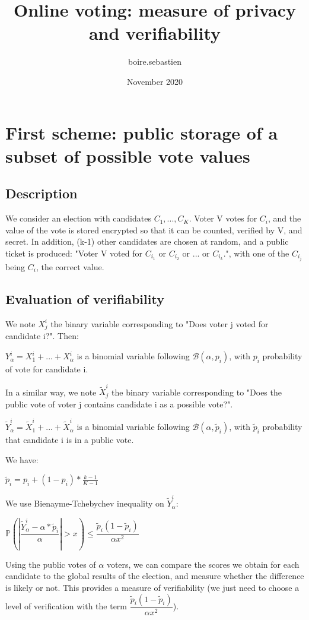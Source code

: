\documentclass{article}
\title{Online voting: measure of privacy and verifiability}
\author{boire.sebastien }
\date{November 2020}
\begin{document}
\maketitle


\section{First scheme: public storage of a subset of possible vote values}

\subsection{Description}

We consider an election with candidates $C_1, ..., C_K$. Voter V votes for $C_i$, and the value of the vote is stored encrypted so that it can be counted, verified by V, and secret. In addition, (k-1) other candidates are chosen at random, and a public ticket is produced: "Voter V voted for $C_{i_1}$ or $C_{i_2}$ or ... or $C_{i_k}$.", with one of the $C_{i_j}$ being $C_i$, the correct value.

\subsection{Evaluation of verifiability}

We note $X^i_j$ the binary variable corresponding to "Does voter j voted for candidate i?". Then:

$Y_\alpha^i=X^i_1+...+X^i_\alpha$ is a binomial variable following $\mathcal{B}(\alpha, p_i)$, with $p_i$ probability of vote for candidate i.

In a similar way, we note $\tilde{X}^i_j$ the binary variable corresponding to "Does the public vote of voter j contains candidate i as a possible vote?".

$\tilde{Y}_\alpha^i=\tilde{X}^i_1+...+\tilde{X}^i_\alpha$ is a binomial variable following $\mathcal{B}(\alpha, \tilde{p}_i)$, with $\tilde{p}_i$ probability that candidate i is in a public vote.

We have:

$\tilde{p}_i=p_i+(1-p_i)*\frac{k-1}{K-1}$


We use Bienayme-Tchebychev inequality on $\tilde{Y}_\alpha^i$:

$ \mathbb{P}(|\dfrac{\tilde{Y}^i_\alpha-\alpha*\tilde{p}_i}{\alpha}| > x )  \leqslant \dfrac{\tilde{p}_i(1-\tilde{p}_i)}{\alpha x^2}$


Using the public votes of $\alpha$ voters, we can compare the scores we obtain for each candidate to the global results of the election, and measure whether the difference is likely or not. This provides a measure of verifiability (we just need to choose a level of verification with the term $\dfrac{\tilde{p}_i(1-\tilde{p}_i)}{\alpha x^2}$).
\end{document}

